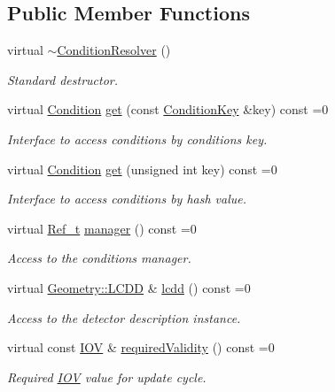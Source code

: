 \subsection*{Public Member Functions}
\begin{DoxyCompactItemize}
\item 
virtual \hyperlink{class_d_d4hep_1_1_conditions_1_1_condition_resolver_abb26bddb3600ca97c9b40cc3a3ad1d40}{$\sim$\+Condition\+Resolver} ()
\begin{DoxyCompactList}\small\item\em Standard destructor. \end{DoxyCompactList}\item 
virtual \hyperlink{class_d_d4hep_1_1_conditions_1_1_condition}{Condition} \hyperlink{class_d_d4hep_1_1_conditions_1_1_condition_resolver_a8d33b49336349b3cf4877244572f1827}{get} (const \hyperlink{class_d_d4hep_1_1_conditions_1_1_condition_key}{Condition\+Key} \&key) const =0
\begin{DoxyCompactList}\small\item\em Interface to access conditions by conditions key. \end{DoxyCompactList}\item 
virtual \hyperlink{class_d_d4hep_1_1_conditions_1_1_condition}{Condition} \hyperlink{class_d_d4hep_1_1_conditions_1_1_condition_resolver_ac321d32bbe1d5e777859c2490c68b571}{get} (unsigned int key) const =0
\begin{DoxyCompactList}\small\item\em Interface to access conditions by hash value. \end{DoxyCompactList}\item 
virtual \hyperlink{group___d_d4_h_e_p___g_e_o_m_e_t_r_y_ga40af83be6718bb8828a3d83dc7f8c930}{Ref\+\_\+t} \hyperlink{class_d_d4hep_1_1_conditions_1_1_condition_resolver_ab8c95a13c7c20b35ab746e6fcc8c420f}{manager} () const =0
\begin{DoxyCompactList}\small\item\em Access to the conditions manager. \end{DoxyCompactList}\item 
virtual \hyperlink{class_d_d4hep_1_1_geometry_1_1_l_c_d_d}{Geometry\+::\+L\+C\+DD} \& \hyperlink{class_d_d4hep_1_1_conditions_1_1_condition_resolver_a9413afdddefecd04036fd7f7b8356fca}{lcdd} () const =0
\begin{DoxyCompactList}\small\item\em Access to the detector description instance. \end{DoxyCompactList}\item 
virtual const \hyperlink{class_d_d4hep_1_1_i_o_v}{I\+OV} \& \hyperlink{class_d_d4hep_1_1_conditions_1_1_condition_resolver_a96b82698fa08d7b1ecb46cd36f5e543f}{required\+Validity} () const =0
\begin{DoxyCompactList}\small\item\em Required \hyperlink{class_d_d4hep_1_1_i_o_v}{I\+OV} value for update cycle. \end{DoxyCompactList}\end{DoxyCompactItemize}



